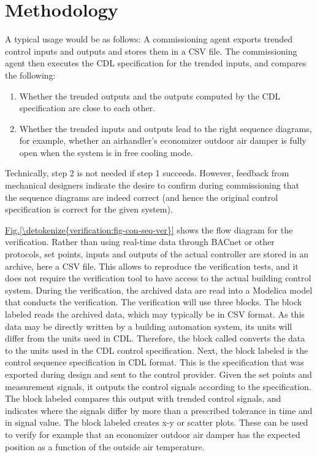 \documentclass[letterpaper,10pt, openany,english]{sphinxmanual}
\begin{document}
\section{Methodology}
\label{\detokenize{verification:methodology}}
A typical usage would be as follows:
A commissioning agent exports trended control inputs and outputs
and stores them in a CSV file. The commissioning agent then executes the CDL specification
for the trended inputs, and compares the following:
\begin{enumerate}
\def\theenumi{\arabic{enumi}}
\def\labelenumi{\theenumi .}
\makeatletter\def\p@enumii{\p@enumi \theenumi .}\makeatother
\item {} 
Whether the trended outputs and the outputs computed by the CDL specification
are close to each other.

\item {} 
Whether the trended inputs and outputs lead to the right sequence diagrams,
for example, whether an airhandler’s economizer outdoor air damper is fully open when
the system is in free cooling mode.

\end{enumerate}

Technically, step 2 is not needed if step 1 succeeds. However,
feedback from mechanical designers indicate the desire to
confirm during commissioning
that the sequence diagrams are indeed correct
(and hence the original control specification is correct for the given system).

\hyperref[\detokenize{verification:fig-con-seq-ver}]{Fig.\@ \ref{\detokenize{verification:fig-con-seq-ver}}} shows the flow diagram for the verification.
Rather than using real-time data through BACnet or other protocols,
set points, inputs and outputs of the actual controller
are stored in an archive, here a CSV file.
This allows to reproduce the verification tests, and it does
not require the verification tool to have access to the actual building
control system.
During the verification, the archived data are read into a Modelica
model that conducts the verification.
The verification will use three blocks.
The block labeled  reads the archived data,
which may typically be in CSV format. As this data may be directly written
by a building automation system, its units will differ from the units
used in CDL. Therefore, the block called  converts
the data to the units used in the CDL control specification.
Next, the block labeled 
is the control sequence specification in CDL format.
This is the specification that was exported during design and sent
to the control provider.
Given the set points and measurement signals, it outputs the control signals
according to the specification.
The block labeled  compares this output with
trended control signals, and indicates where the signals differ by more than
a prescribed tolerance in time and in signal value.
The block labeled  creates x-y or scatter plots. These
can be used to verify for example that an economizer outdoor air damper
has the expected position as a function of the outside air temperature.
\end{document}
